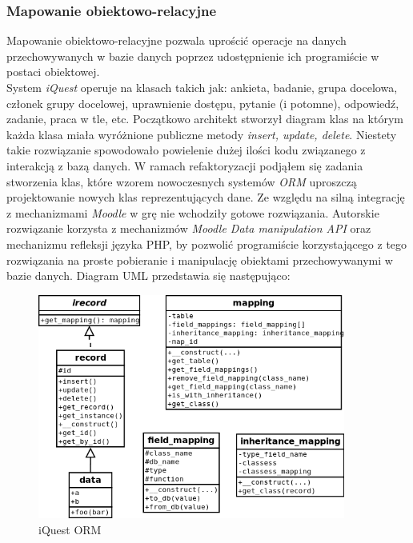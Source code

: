 \documentclass[12pt]{article}
\begin{document}
\subsubsection{Mapowanie obiektowo-relacyjne}
Mapowanie obiektowo-relacyjne pozwala uprościć operacje na danych przechowywanych w bazie danych poprzez udostępnienie ich programiście w postaci obiektowej.\\
System \emph{iQuest} operuje na klasach takich jak: ankieta, badanie, grupa docelowa, członek grupy docelowej, uprawnienie dostępu, pytanie (i potomne), odpowiedź, zadanie, praca w tle, etc. Początkowo architekt stworzył diagram klas na którym każda klasa miała wyróżnione publiczne metody \emph{insert, update, delete}. Niestety takie rozwiązanie spowodowało powielenie dużej ilości kodu związanego z interakcją z bazą danych. W ramach refaktoryzacji podjąłem się zadania stworzenia klas, które wzorem nowoczesnych systemów \emph{ORM} uproszczą projektowanie nowych klas reprezentujących dane. Ze względu na silną integrację z mechanizmami \emph{Moodle} w grę nie wchodziły gotowe rozwiązania. Autorskie rozwiązanie korzysta z mechanizmów \emph{Moodle Data manipulation API} oraz mechanizmu refleksji języka PHP, by pozwolić programiście korzystającego z tego rozwiązania na proste pobieranie i manipulację obiektami przechowywanymi w bazie danych. Diagram UML przedstawia się następująco:
\begin{figure}[H]
\begin{center}
\includegraphics[width=0.9\textwidth]{img/iquest-orm.png} 
\end{center}
\caption{iQuest ORM}
\label{fig:iquest-orm}
\end{figure}
\end{document}
